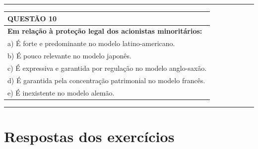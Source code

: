 \documentclass[
]{book}
\begin{document}
\begin{center}\rule{0.5\linewidth}{0.5pt}\end{center}

\begin{longtable}[]{@{}l@{}}
\toprule\noalign{}
\textbf{QUESTÃO 10} \\
\midrule\noalign{}
\endhead
\bottomrule\noalign{}
\endlastfoot
\textbf{Em relação à proteção legal dos acionistas minoritários:} \\
a) É forte e predominante no modelo latino-americano. \\
b) É pouco relevante no modelo japonês. \\
c) É expressiva e garantida por regulação no modelo anglo-saxão. \\
d) É garantida pela concentração patrimonial no modelo francês. \\
e) É inexistente no modelo alemão. \\
\end{longtable}

\begin{center}\rule{0.5\linewidth}{0.5pt}\end{center}

\section{Respostas dos exercícios}\label{respostas-dos-exercuxedcios}
\end{document}
